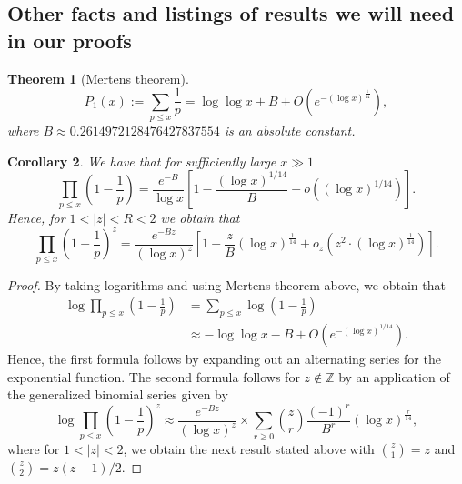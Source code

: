 \documentclass[11pt,reqno,a4letter]{article}
\numberwithin{figure}{section}
\numberwithin{table}{section}
\theoremstyle{plain}
\newtheorem{theorem}{Theorem}
\newtheorem{cor}[theorem]{Corollary}
\numberwithin{theorem}{section}
\theoremstyle{definition}
\begin{document}
\subsection{Other facts and listings of results we will need in our proofs} 
\label{subSection_OtherFactsAndResults} 

\begin{theorem}[Mertens theorem]
\label{theorem_Mertens_theorem}  
\[
P_1(x) := \sum_{p \leq x} \frac{1}{p} = \log\log x + B + O\left(e^{-(\log x)^{\frac{1}{14}}}\right), 
\]
where $B \approx 0.2614972128476427837554$ is an absolute constant.
\end{theorem} 

\begin{cor}
\label{lemma_Gz_productTermV2} 
We have that for sufficiently large $x \gg 1$ 
\[
\prod_{p \leq x} \left(1 - \frac{1}{p}\right) = \frac{e^{-B}}{\log x}\left[ 
     1 - \frac{(\log x)^{1/14}}{B} + o\left((\log x)^{1/14}\right)\right]. 
\]
Hence, for $1 < |z| < R < 2$ we obtain that 
\[
\prod_{p \leq x} \left(1 - \frac{1}{p}\right)^{z} = \frac{e^{-Bz}}{(\log x)^{z}} \left[ 
     1 - \frac{z}{B} (\log x)^{\frac{1}{14}} + o_z\left(z^2 \cdot (\log x)^{\frac{1}{14}}\right)\right]. 
\]
\end{cor} 
\begin{proof} 
By taking logarithms and using Mertens theorem above, we obtain that 
\begin{align*} 
\log \prod_{p \leq x} \left(1-\frac{1}{p}\right) & = \sum_{p \leq x} \log\left(1-\frac{1}{p}\right) \\ 
     & \approx -\log\log x - B +O\left(e^{-(\log x)^{1/14}}\right). 
\end{align*} 
Hence, the first formula follows by expanding out an alternating series for the exponential 
function. The second formula follows for $z \notin \mathbb{Z}$ by an application of the 
generalized binomial series given by 
\[
\log \prod_{p \leq x} \left(1-\frac{1}{p}\right)^{z} \approx \frac{e^{-Bz}}{(\log x)^{z}} \times 
     \sum_{r \geq 0} \binom{z}{r} \frac{(-1)^r}{B^r} (\log x)^{\frac{r}{14}}, 
\]
where for $1 < |z| < 2$, we obtain the next result stated above with 
$\binom{z}{1} = z$ and $\binom{z}{2} = z(z-1) / 2$. 
\end{proof} 
\end{document}
